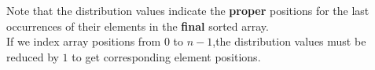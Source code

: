 \documentclass[preview]{standalone}
\begin{document}
\begin{center}
Note that the distribution values indicate the \textbf{proper} positions for the last occurrences of their elements in the \textbf{final} sorted array.\\ If we index array positions from 0 to $n − 1$,the distribution values must be reduced by $1$ to get corresponding element positions.
\end{center}
\end{document}
